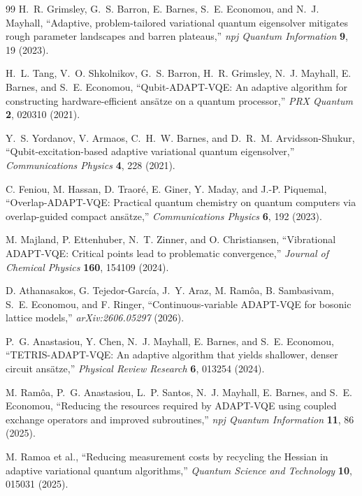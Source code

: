 \documentclass[
  reprint,
  amsmath,
  amssymb,
  aps,
  pra,
  nofootinbib,
  superscriptaddress,
  floatfix
]{revtex4-2}
\begin{document}
\begin{thebibliography}{99}
H.~R. Grimsley, G.~S. Barron, E. Barnes, S.~E. Economou, and N.~J. Mayhall,
``Adaptive, problem-tailored variational quantum eigensolver mitigates rough parameter landscapes and barren plateaus,''
\emph{npj Quantum Information} \textbf{9}, 19 (2023).

H.~L. Tang, V.~O. Shkolnikov, G.~S. Barron, H.~R. Grimsley, N.~J. Mayhall, E. Barnes, and S.~E. Economou,
``Qubit-ADAPT-VQE: An adaptive algorithm for constructing hardware-efficient ans\"atze on a quantum processor,''
\emph{PRX Quantum} \textbf{2}, 020310 (2021).

Y.~S. Yordanov, V. Armaos, C.~H.~W. Barnes, and D.~R.~M. Arvidsson-Shukur,
``Qubit-excitation-based adaptive variational quantum eigensolver,''
\emph{Communications Physics} \textbf{4}, 228 (2021).

C. Feniou, M. Hassan, D. Traor\'e, E. Giner, Y. Maday, and J.-P. Piquemal,
``Overlap-ADAPT-VQE: Practical quantum chemistry on quantum computers via overlap-guided compact ans\"atze,''
\emph{Communications Physics} \textbf{6}, 192 (2023).

M. Majland, P. Ettenhuber, N.~T. Zinner, and O. Christiansen,
``Vibrational ADAPT-VQE: Critical points lead to problematic convergence,''
\emph{Journal of Chemical Physics} \textbf{160}, 154109 (2024).

D. Athanasakos, G. Tejedor-Garc\'ia, J.~Y. Araz, M. Ram\^oa, B. Sambasivam, S.~E. Economou, and F. Ringer,
``Continuous-variable ADAPT-VQE for bosonic lattice models,''
\emph{arXiv:2606.05297} (2026).

P.~G. Anastasiou, Y. Chen, N.~J. Mayhall, E. Barnes, and S.~E. Economou,
``TETRIS-ADAPT-VQE: An adaptive algorithm that yields shallower, denser circuit ans\"atze,''
\emph{Physical Review Research} \textbf{6}, 013254 (2024).

M. Ram\^oa, P.~G. Anastasiou, L.~P. Santos, N.~J. Mayhall, E. Barnes, and S.~E. Economou,
``Reducing the resources required by ADAPT-VQE using coupled exchange operators and improved subroutines,''
\emph{npj Quantum Information} \textbf{11}, 86 (2025).

M. Ramoa et al.,
``Reducing measurement costs by recycling the Hessian in adaptive variational quantum algorithms,''
\emph{Quantum Science and Technology} \textbf{10}, 015031 (2025).


\end{thebibliography}
\end{document}
